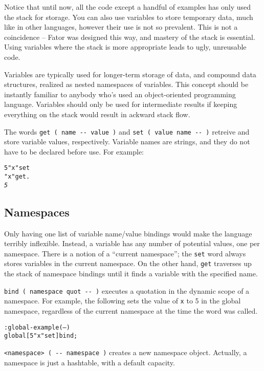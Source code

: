 \documentclass[english]{article}
\begin{document}
{Notice that until now, all the code except a handful of examples has only used the stack for storage. You can also use variables to store temporary data, much like in other languages, however their use is not so prevalent. This is not a coincidence -- Fator was designed this way, and mastery of the stack is essential. Using variables where the stack is more appropriate leads to ugly, unreusable code.

Variables are typically used for longer-term storage of data, and compound data structures, realized as nested namespaces of variables. This concept should be instantly familiar to anybody who's used an object-oriented programming language. Variables should only be used for intermediate results if keeping everything on the stack would result in ackward stack flow.

The words \texttt{get ( name -{}- value )} and \texttt{set ( value name -{}- )} retreive and store variable values, respectively. Variable names are strings, and they do not have to be declared before use. For example:

\begin{alltt}
5 "x" set
"x" get .
\emph{5}
\end{alltt}

\subsection{Namespaces}

Only having one list of variable name/value bindings would make the language terribly inflexible. Instead, a variable has any number of potential values, one per namespace. There is a notion of a ``current namespace''; the \texttt{set} word always stores variables in the current namespace. On the other hand, \texttt{get} traverses up the stack of namespace bindings until it finds a variable with the specified name.

\texttt{bind ( namespace quot -{}- )} executes a quotation in the dynamic scope of a namespace. For example, the following sets the value of \texttt{x} to 5 in the global namespace, regardless of the current namespace at the time the word was called.

\begin{alltt}
: global-example ( -- )
    global {[} 5 "x" set {]} bind ;
\end{alltt}

\texttt{<namespace> ( -{}- namespace )} creates a new namespace object. Actually, a namespace is just a hashtable, with a default capacity.

}
\end{document}
